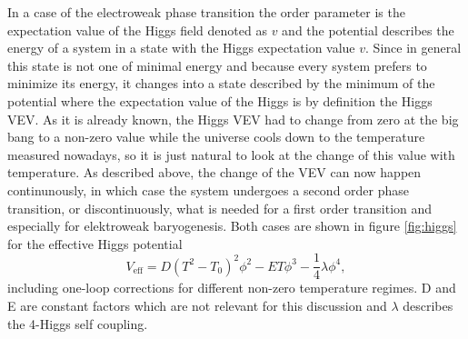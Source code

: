 In a case of the electroweak phase transition the order parameter is the expectation value of the Higgs field denoted as $v$ and the potential describes the energy of a system in a state with the Higgs expectation value $v$. Since in general this state is not one of minimal energy and because every system prefers to minimize its energy, it changes into a state described by the minimum of the potential where the expectation value of the Higgs is by definition the Higgs VEV. \newline\indent
As it is already known, the Higgs VEV had to change from zero at the big bang to a non-zero value while the universe cools down to the temperature measured nowadays, so it is just natural to look at the change of this value with temperature. As described above, the change of the VEV can now happen continunously, in which case the system undergoes a second order phase transition, or discontinuously, what is needed for a first order transition and especially for elektroweak baryogenesis. 
Both cases are shown in figure \ref{fig:higgs} for the effective Higgs potential
\begin{equation}
	V_\text{eff}=D(T^2-T_0)^2\phi^2-ET\phi^3-\frac{1}{4}\lambda\phi^4,
	\label{effective_pot}
\end{equation}
including one-loop corrections \cite{Petropoulos:2003pm} for different non-zero temperature regimes. D and E are constant factors which are not relevant for this discussion and $\lambda$ describes the 4-Higgs self coupling.
